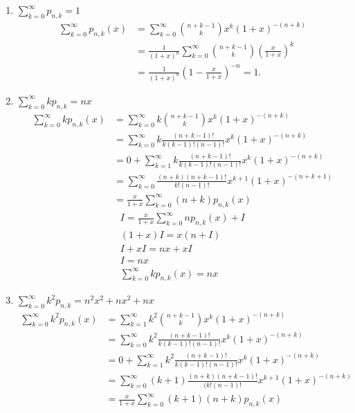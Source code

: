 \begin{english}
\begin{enumerate}[label=\arabic*)]
		\item $\sum_{k=0}^{\infty} p_{n,k} = 1$
	\begin{align*}
		\sum_{k=0}^{\infty} p_{n,k}(x) &= \sum_{k=0}^{\infty} \binom{n+k-1}{k} x^k (1+x)^{-(n+k)} \\
		&= \frac{1}{(1+x)^n} \sum_{k=0}^{\infty} \binom{n+k-1}{k} \left( \frac{x}{1+x} \right)^k \\
		&= \frac{1}{(1+x)^n} \left( 1 - \frac{x}{1+x} \right)^{-n} = 1.
	\end{align*}
	\newpage
		\item $\sum_{k=0}^{\infty}k p_{n,k} = nx$
	\begin{align*}
		\sum_{k=0}^{\infty} k p_{n,k}(x) &= \sum_{k=0}^{\infty} k \binom{n+k-1}{k} x^k (1+x)^{-(n+k)} \\
		&= \sum_{k=0}^{\infty} k \frac{(n+k-1)!}{k(k-1)!(n-1)!} x^k (1+x)^{-(n+k)} \\
		&= 0 + \sum_{k=1}^{\infty} k \frac{(n+k-1)!}{k(k-1)!(n-1)!} x^k (1+x)^{-(n+k)} \\
		&= \sum_{k=0}^{\infty} \frac{(n+k)(n+k-1)!}{k!(n-1)!} x^{k+1} (1+x)^{-(n+k+1)} \\
		&= \frac{x}{1+x} \sum_{k=0}^{\infty} (n+k) p_{n,k}(x)
	\end{align*}
\begin{gather*}
	I = \frac{x}{1+x} \sum_{k=0}^{\infty} n p_{n,k}(x) + I\\
	(1+x) I = x(n+I)\\
	I + xI = nx + xI\\
	I = nx\\
	\sum_{k=0}^{\infty} k p_{n,k}(x) = nx
\end{gather*}
\newpage
		\item $\sum_{k=0}^{\infty}k^2 p_{n,k} = n^2 x^2 + nx^2 + nx$
	\begin{align*}
		\sum_{k=0}^{\infty} k^2 p_{n,k}(x) &= \sum_{k=1}^{\infty} k^2 \binom{n+k-1}{k} x^k (1+x)^{-(n+k)} \\
		&= \sum_{k=0}^{\infty} k^2 \frac{(n+k-1)!}{k(k-1)!(n-1)!} x^k (1+x)^{-(n+k)} \\
		&= 0 + \sum_{k=1}^{\infty} k^2 \frac{(n+k-1)!}{k(k-1)!(n-1)!} x^k (1+x)^{-(n+k)} \\
		&= \sum_{k=0}^{\infty} (k+1) \frac{(n+k)(n+k-1)!}{(k!(n-1)!} x^{k+1} (1+x)^{-(n+k)} \\
		&= \frac{x}{1+x} \sum_{k=0}^{\infty} (k+1)(n+k) p_{n,k}(x)\\

\end{align*}
\end{enumerate}
\end{english}
